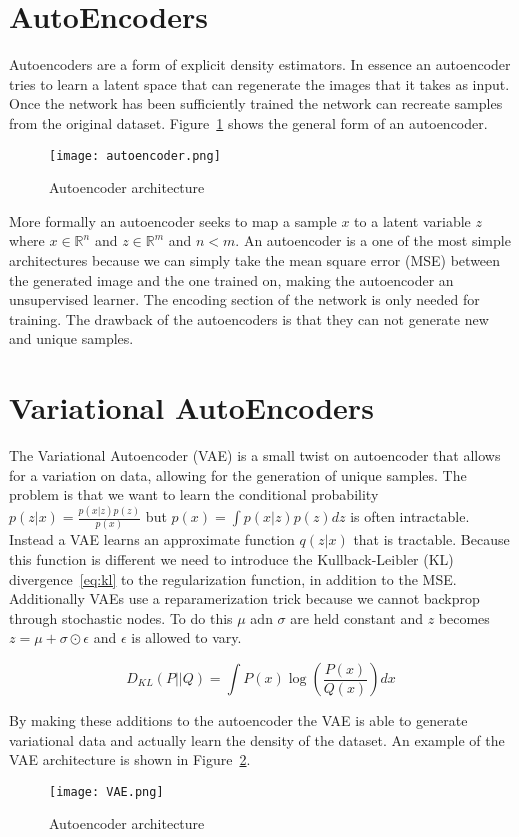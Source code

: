 \section{AutoEncoders}\label{sec:autoencoder}
Autoencoders are a form of explicit density estimators. In essence an
autoencoder tries to learn a latent space that can regenerate the images that it
takes as input. Once the network has been sufficiently trained the network can
recreate samples from the original dataset. Figure~\ref{fig:ae} shows the
general form of an autoencoder.

\begin{figure}[ht]
\centering
\texttt{[image: autoencoder.png]}
\caption{Autoencoder architecture}
\label{fig:ae}
\end{figure}

More formally an autoencoder seeks to map a sample $x$ to a latent variable $z$
where $x\in\mathbb{R}^n$ and $z\in\mathbb{R}^m$ and $n<m$. An autoencoder is a
one of the most simple architectures because we can simply take the mean square
error (MSE) between the generated image and the one trained on, making the
autoencoder an unsupervised learner. The encoding section of the network is only
needed for training. The drawback of the autoencoders is that they can not
generate new and unique samples. 

\section{Variational AutoEncoders}\label{sec:vae}
The Variational Autoencoder (VAE) is a small twist on autoencoder that allows
for a variation on data, allowing for the generation of unique samples. The
problem is that we want to learn the conditional probability 
$p(z|x) =\frac{p(x|z)p(z)}{p(x)}$ but $p(x) = \int p(x|z)p(z)dz$ is often
intractable. Instead a VAE learns an approximate function $q(z|x)$ that is
tractable. Because this function is different we need to introduce the
Kullback-Leibler (KL) divergence~\ref{eq:kl} to the regularization function, in
addition to the MSE. Additionally VAEs use a reparamerization trick because we
cannot backprop through stochastic nodes. To do this $\mu$ adn $\sigma$ are held
constant and $z$ becomes $z=\mu + \sigma\odot\epsilon$ and $\epsilon$ is allowed
to vary.

\begin{equation}
D_{KL}(P||Q) = \int P(x)\log\left(\frac{P(x)}{Q(x)}\right)dx
\label{eg:kl}
\end{equation}

By making these additions to the autoencoder the VAE is able to generate
variational data and actually learn the density of the dataset. An example of
the VAE architecture is shown in Figure~\ref{fig:vae}.

\begin{figure}[ht]
\centering
\texttt{[image: VAE.png]}
\caption{Autoencoder architecture}
\label{fig:vae}
\end{figure}
